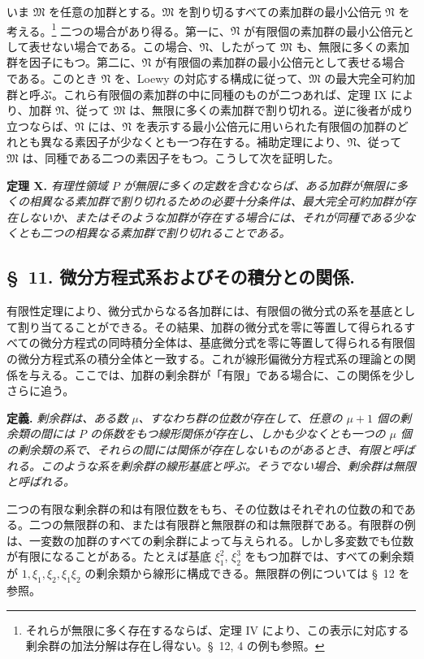 \documentclass[11pt]{article}
\begin{document}
いま $\mathfrak M$ を任意の加群とする。$\mathfrak M$ を割り切るすべての素加群の最小公倍元 $\mathfrak N$ を考える。\footnote{それらが無限に多く存在するならば、定理 IV により、この表示に対応する剰余群の加法分解は存在し得ない。\S~12, 4 の例も参照。} 二つの場合があり得る。第一に、$\mathfrak N$ が有限個の素加群の最小公倍元として表せない場合である。この場合、$\mathfrak N$、したがって $\mathfrak M$ も、無限に多くの素加群を因子にもつ。第二に、$\mathfrak N$ が有限個の素加群の最小公倍元として表せる場合である。このとき $\mathfrak N$ を、Loewy の対応する構成に従って、$\mathfrak M$ の最大完全可約加群と呼ぶ。これら有限個の素加群の中に同種のものが二つあれば、定理 IX により、加群 $\mathfrak N$、従って $\mathfrak M$ は、無限に多くの素加群で割り切れる。逆に後者が成り立つならば、$\mathfrak N$ には、$\mathfrak N$ を表示する最小公倍元に用いられた有限個の加群のどれとも異なる素因子が少なくとも一つ存在する。補助定理により、$\mathfrak N$、従って $\mathfrak M$ は、同種である二つの素因子をもつ。こうして次を証明した。

\textbf{定理 X.} \emph{有理性領域 $P$ が無限に多くの定数を含むならば、ある加群が無限に多くの相異なる素加群で割り切れるための必要十分条件は、最大完全可約加群が存在しないか、またはそのような加群が存在する場合には、それが同種である少なくとも二つの相異なる素加群で割り切れることである。}

\subsection*{\S~11. 微分方程式系およびその積分との関係.}

有限性定理により、微分式からなる各加群には、有限個の微分式の系を基底として割り当てることができる。その結果、加群の微分式を零に等置して得られるすべての微分方程式の同時積分全体は、基底微分式を零に等置して得られる有限個の微分方程式系の積分全体と一致する。これが線形偏微分方程式系の理論との関係を与える。ここでは、加群の剰余群が「有限」である場合に、この関係を少しさらに追う。

\textbf{定義.} \emph{剰余群は、ある数 $\mu$、すなわち群の位数が存在して、任意の $\mu+1$ 個の剰余類の間には $P$ の係数をもつ線形関係が存在し、しかも少なくとも一つの $\mu$ 個の剰余類の系で、それらの間には関係が存在しないものがあるとき、有限と呼ばれる。このような系を剰余群の線形基底と呼ぶ。そうでない場合、剰余群は無限と呼ばれる。}

二つの有限な剰余群の和は有限位数をもち、その位数はそれぞれの位数の和である。二つの無限群の和、または有限群と無限群の和は無限群である。有限群の例は、一変数の加群のすべての剰余群によって与えられる。しかし多変数でも位数が有限になることがある。たとえば基底 $\xi_1^2$, $\xi_2^3$ をもつ加群では、すべての剰余類が $1,\xi_1,\xi_2,\xi_1\xi_2$ の剰余類から線形に構成できる。無限群の例については \S~12 を参照。
\end{document}
